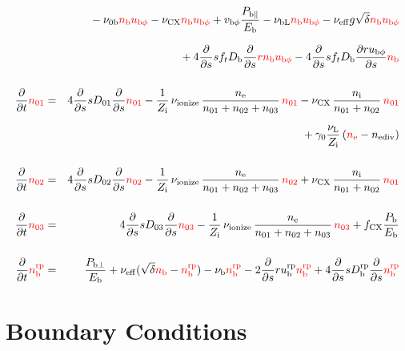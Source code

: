 \documentclass[11pt]{article}
\def\r#1{{\rm#1}}
\def\ddt{\frac{\partial}{\partial t}}
\def\dds{\frac{\partial}{\partial s}}
\def\dd#1{\frac{\partial #1}{\partial s}}
\def\nee{n_\r{e}}
\def\ni{n_\r{i}}
\def\nb{n_\r{b}}
\def\ubph{u_{\r{b}\phi}}
\def\nna{n_{01}}
\def\nnb{n_{02}}
\def\nnc{n_{03}}
\def\Zi{Z_\r{i}}
\def\Pb{P_\r{b}}
\def\Eb{E_\r{b}}
\def\nbrp{n_\r{b}^\r{rp}}
\def\Pbpara{P_{\r{b}\parallel}}
\def\Pbperp{P_{\r{b}\perp}}
\def\nueff{\nu_\r{eff}}
\def\ubrp{u_\r{b}^\r{rp}}
\def\Dbrp{D_\r{b}^\r{rp}}
\def\Db{D_\r{b}}
\def\fCX{f_\r{CX}}
\def\nunb{\nu_\r{0b}}
\def\nuL{\nu_\r{L}}
\def\nuCX{\nu_\r{CX}}
\def\nuion{\nu_\r{ionize}}
\def\nub{\nu_\r{b}}
\def\nediv{n_\r{ediv}}
\def\nubL{\nu_\r{bL}}
\def\vbph{v_{\r{b}\phi}}
\def\red#1{\textcolor{red}{#1}}
\begin{document}
\begin{eqnarray}
\nonumber\\[2.5mm]&&{}
%
  - \nunb \red{\nb \ubph}
%
  - \nuCX \red{\nb \ubph}
%
  + \vbph \frac{\Pbpara}{\Eb}
%
  - \nubL \red{\nb \ubph}
%
  - \nueff g \sqrt{\delta} \red{\nb \ubph}
\nonumber\\[2.5mm]&&{}
%
  + 4 \dds s f_t \Db \dds \red{r \nb \ubph}
%
  - 4 \dds s f_t \Db \dd{r\ubph} \red{\nb}
\\[5mm]
  \ddt \red{\nna} &=& 
%
    4 \dds s D_{01} \dds \red{\nna}
%
  - \frac{1}{\Zi}\, \nuion\, \frac{\nee}{\nna + \nnb + \nnc}\, \red{\nna}
%
  - \nuCX\, \frac{\ni}{\nna + \nnb}\, \red{\nna}
\nonumber\\[2.5mm]&&{}
%
  + \gamma_0 \frac{\nuL}{\Zi} \, (\red{\nee} - \nediv)
\\[5mm]
  \ddt \red{\nnb} &=& 
%
    4 \dds s D_{02} \dds \red{\nnb}
%
  - \frac{1}{\Zi}\, \nuion\, \frac{\nee}{\nna + \nnb + \nnc}\, \red{\nnb}
%
  + \nuCX\, \frac{\ni}{\nna + \nnb}\, \red{\nna}
%
\\[5mm]
  \ddt \red{\nnc} &=& 
%
    4 \dds s D_{03} \dds \red{\nnc}
%
  - \frac{1}{\Zi}\, \nuion\, \frac{\nee}{\nna + \nnb + \nnc}\, \red{\nnc}
%
  + \fCX \frac{\Pb}{\Eb}
\\[5mm]
  \ddt \red{\nbrp} &=&
%
    \frac{\Pbperp}{\Eb}
%
  + \nueff (\sqrt{\delta} \red{\nb} - \red{\nbrp})
%
  - \nub \red{\nbrp}
%
  - 2 \dds r \ubrp \red{\nbrp} + 4 \dds s \Dbrp \dds \red{\nbrp}
%
\end{eqnarray}

\bigskip

\section{Boundary Conditions}
\end{document}
